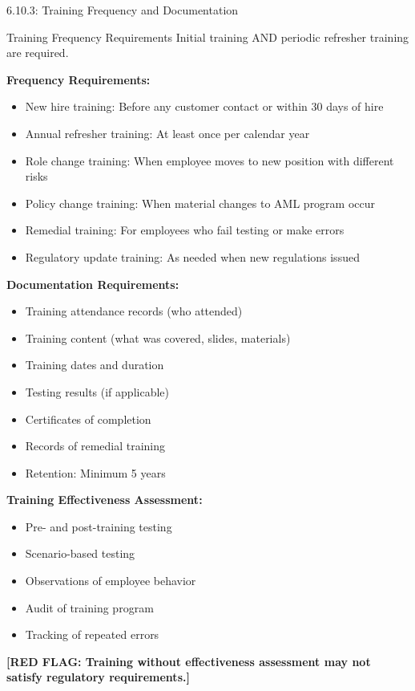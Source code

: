 \documentclass[11pt,a4paper]{beamer}
\newcommand{\redflag}[1]{\textcolor{red!80!black}{\textbf{[RED FLAG: #1]}}}
\begin{document}
\begin{frame}{6.10.3: Training Frequency and Documentation}
	\begin{block}{Training Frequency Requirements}
		Initial training AND periodic refresher training are required.
	\end{block}
	\textbf{Frequency Requirements:}
	\begin{itemize}
		\item New hire training: Before any customer contact or within 30 days of hire
		\item Annual refresher training: At least once per calendar year
		\item Role change training: When employee moves to new position with different risks
		\item Policy change training: When material changes to AML program occur
		\item Remedial training: For employees who fail testing or make errors
		\item Regulatory update training: As needed when new regulations issued
	\end{itemize}
	\textbf{Documentation Requirements:}
	\begin{itemize}
		\item Training attendance records (who attended)
		\item Training content (what was covered, slides, materials)
		\item Training dates and duration
		\item Testing results (if applicable)
		\item Certificates of completion
		\item Records of remedial training
		\item Retention: Minimum 5 years
	\end{itemize}
	\textbf{Training Effectiveness Assessment:}
	\begin{itemize}
		\item Pre- and post-training testing
		\item Scenario-based testing
		\item Observations of employee behavior
		\item Audit of training program
		\item Tracking of repeated errors
	\end{itemize}
	\redflag{Training without effectiveness assessment may not satisfy regulatory requirements.}
\end{frame}
\end{document}
